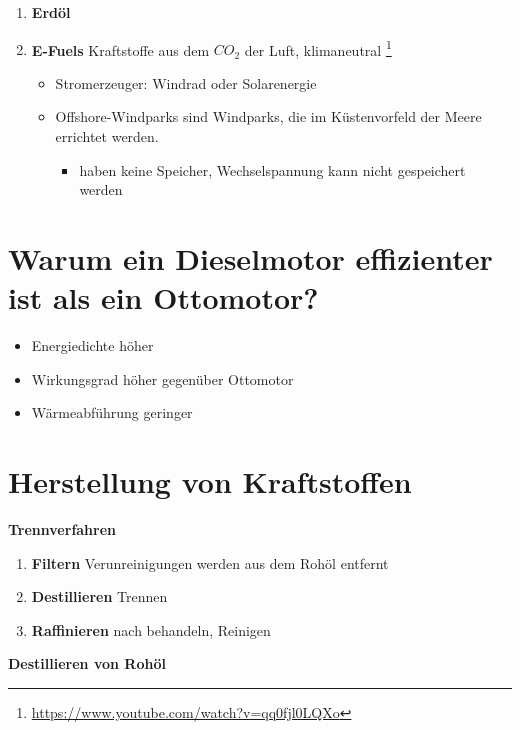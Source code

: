 \begin{enumerate}
\item
  \textbf{Erdöl}
\item
  \textbf{E-Fuels} Kraftstoffe aus dem $CO_2$ der Luft, klimaneutral
  \footnote{\url{https://www.youtube.com/watch?v=qq0fjl0LQXo}}

  \begin{itemize}
  \item
    Stromerzeuger: Windrad oder Solarenergie
  \item
    Offshore-Windparks sind Windparks, die im Küstenvorfeld der Meere
    errichtet werden.

    \begin{itemize}
    \item
      haben keine Speicher, Wechselspannung kann nicht gespeichert
      werden
    \end{itemize}
  \end{itemize}
\end{enumerate}

\section{Warum ein Dieselmotor effizienter ist als ein
Ottomotor?}\label{warum-ein-dieselmotor-effizienter-ist-als-ein-ottomotor}

\begin{itemize}
\item
  Energiedichte höher
\item
  Wirkungsgrad höher gegenüber Ottomotor
\item
  Wärmeabführung geringer
\end{itemize}

\section{Herstellung von
Kraftstoffen}\label{herstellung-von-kraftstoffen}

\textbf{Trennverfahren}

\begin{enumerate}
\item
  \textbf{Filtern} Verunreinigungen werden aus dem Rohöl entfernt
\item
  \textbf{Destillieren} Trennen
\item
  \textbf{Raffinieren} nach behandeln, Reinigen
\end{enumerate}

\textbf{Destillieren von Rohöl}

